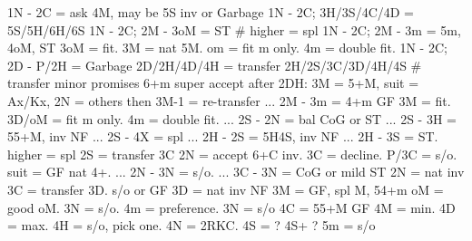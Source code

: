 1N -
2C = ask 4M, may be 5S inv or Garbage
    1N - 2C; 3H/3S/4C/4D = 5S/5H/6H/6S
    1N - 2C; 2M - 3oM = ST  # higher = spl
    1N - 2C; 2M - 3m = 5m, 4oM, ST
        3oM = fit. 3M = nat 5M. om = fit m only. 4m = double fit.
    1N - 2C; 2D - P/2H = Garbage
2D/2H/4D/4H = transfer 2H/2S/3C/3D/4H/4S  # transfer minor promises 6+m
    super accept after 2DH: 3M = 5+M, suit = Ax/Kx, 2N = others
        then 3M-1 = re-transfer
    ... 2M - 3m = 4+m GF
        3M = fit. 3D/oM = fit m only. 4m = double fit.
    ... 2S - 2N = bal CoG or ST
    ... 2S - 3H = 55+M, inv NF
    ... 2S - 4X = spl
    ... 2H - 2S = 5H4S, inv NF
    ... 2H - 3S = ST. higher = spl
2S = transfer 3C
    2N = accept 6+C inv. 3C = decline.
        P/3C = s/o. suit = GF nat 4+. 
        ... 2N - 3N = s/o. ... 3C - 3N = CoG or mild ST
2N = nat inv
3C = transfer 3D. s/o or GF
3D = nat inv NF
3M = GF, spl M, 54+m
    oM = good oM. 3N = s/o. 4m = preference.
3N = s/o
4C = 55+M GF
    4M = min. 
    4D = max.
        4H = s/o, pick one. 4N = 2RKC. 4S = ?
4S+ ?
5m = s/o
